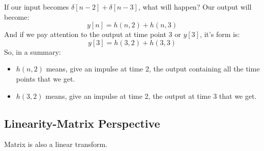         If our input becomes $\delta[n-2] + \delta[n-3]$, what will happen? Our output will become:
                    \begin{equation}
                        y[n] = h(n,2) + h(n,3)
                    \end{equation}
        And if we pay attention to the output at time point 3 or $y[3]$, it's form is:
                    \begin{equation}
                        y[3] = h(3,2) + h(3,3)
                    \end{equation}
        So, in a summary:
                    \begin{itemize}
                        \item $h(n,2)$ means, give an impulse at time 2, the output containing all the time points that we get.
                        \item $h(3,2)$ means, give an impulse at time 2, the output at time 3 that we get.
                    \end{itemize}
        

        \subsection{Linearity-Matrix Perspective}
        Matrix is also a linear transform.

